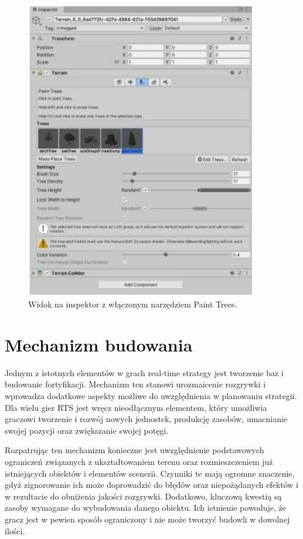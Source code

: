 \begin{figure}[htbp]
    \centering
    \includegraphics[width=0.9\textwidth]{images/modelowanie_terenu/malowanie_drzew.jpg}
    \caption{Widok na inspektor z włączonym narzędziem Paint Trees.}\label{fig:malowanie_drzew}
\end{figure}


\section{Mechanizm budowania}\label{chap:build}
Jednym z istotnych elementów w grach real-time strategy jest tworzenie baz i budowanie fortyfikacji. Mechanizm ten stanowi urozmaicenie rozgrywki i wprowadza dodatkowe aspekty możliwe do uwzględnienia w planowaniu strategii. Dla wielu gier RTS jest wręcz nieodłącznym elementem, który umożliwia graczowi tworzenie i rozwój nowych jednostek, produkcję zasobów, umacnianie swojej pozycji oraz zwiększanie swojej potęgi.

Rozpatrując ten mechanizm konieczne jest uwzględnienie podstawowych ograniczeń związanych z ukształtowaniem terenu oraz rozmieszczeniem już istniejących obiektów i elementów scenerii. Czynniki te mają ogromne znaczenie, gdyż zignorowanie ich może doprowadzić do błędów oraz niepożądanych efektów i w rezultacie do obniżenia jakości rozgrywki. Dodatkowo, kluczową kwestią są zasoby wymagane do wybudowania danego obiektu. Ich istnienie powoduje, że gracz jest w pewien sposób ograniczony i nie może tworzyć budowli w dowolnej ilości.

